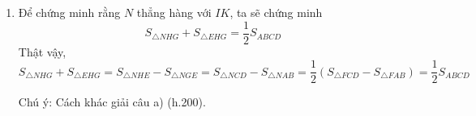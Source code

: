 \begin{bt}
{\begin{enumerate}
	Ta có \[ S_{\triangle{IHG}} + S_{\triangle{EHG}} = S_{\triangle{IHEG}} = S_{\triangle{IHE}} + S_{\triangle{IGE}} = S_{\triangle{ICD}} + S_{\triangle{IAB}} = \dfrac{1}{2}S_{ABCD} \tag{1}\]
	\[ S_{\triangle{KHG}} + S_{\triangle{EHG}} = S_{KHEG} = S_{\triangle{KHE}} + S_{\triangle{KGE}} = S_{\triangle{KCD}} + S_{\triangle{KAB}} = \dfrac{1}{2}S_{ABCD} \tag{2}\]
	\[ S_{\triangle{MHG}} + S_{\triangle{EHG}} = S_{MHGE} = S_{\triangle{MHE}} + S_{\triangle{MGE}} = S_{\triangle{MCD}} + S_{\triangle{MAB}} = \dfrac{1}{2}S_{ABCD} \tag{3}\]
	
	Từ (1), (2), (3) suy ra $S_{\triangle{IGH}} = S_{\triangle{KGH}} = S_{\triangle{MGH}}$. Do đó khoảng cách từ $I$, $K$, $M$ đến $HG$ như nhau nên $I$, $K$, $M$ thuộc cùng một đường thẳng song song với $HG$. Các điểm $M$ nằm trên phần đường thẳng $IK$ thuộc miền tứ giác $ABCD$.
	\item Để chứng minh rằng $N$ thẳng hàng với $IK$, ta sẽ chứng minh $$ S_{\triangle{NHG}} + S_{\triangle{EHG}} = \dfrac{1}{2}S_{ABCD} $$ Thật vậy, \[ S_{\triangle{NHG}} + S_{\triangle{EHG}} = S_{\triangle{NHE}} - S_{\triangle{NGE}} = S_{\triangle{NCD}} - S_{\triangle{NAB}} = \dfrac{1}{2} \left( S_{\triangle{FCD}} - S_{\triangle{FAB}} \right) = \dfrac{1}{2}S_{ABCD} \tag{4} \]
	
	Chú ý: Cách khác giải câu a) (h.200).
	
	\begin{center}


\end{center}
\end{enumerate}}
\end{bt}
